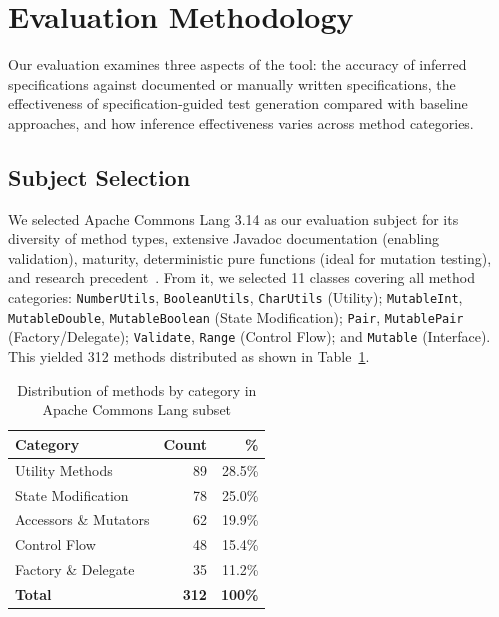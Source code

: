 \section{Evaluation Methodology}
\label{sec:methodology}

Our evaluation examines three aspects of the tool: the accuracy of inferred specifications against documented or manually written specifications, the effectiveness of specification-guided test generation compared with baseline approaches, and how inference effectiveness varies across method categories.

\subsection{Subject Selection}

We selected Apache Commons Lang 3.14 as our evaluation subject for its diversity of method types, extensive Javadoc documentation (enabling validation), maturity, deterministic pure functions (ideal for mutation testing), and research precedent~\cite{pacheco2007randoop, fraser2011evosuite}. From it, we selected 11 classes covering all method categories: \texttt{NumberUtils}, \texttt{BooleanUtils}, \texttt{CharUtils} (Utility); \texttt{MutableInt}, \texttt{MutableDouble}, \texttt{MutableBoolean} (State Modification); \texttt{Pair}, \texttt{MutablePair} (Factory/Delegate); \texttt{Validate}, \texttt{Range} (Control Flow); and \texttt{Mutable} (Interface). This yielded 312 methods distributed as shown in Table~\ref{tab:method-distribution}.

\begin{table}[ht]
\centering
\caption{Distribution of methods by category in Apache Commons Lang subset}
\label{tab:method-distribution}
\begin{tabular}{lrr}
\toprule
\textbf{Category} & \textbf{Count} & \textbf{\%} \\
\midrule
Utility Methods & 89 & 28.5\% \\
State Modification & 78 & 25.0\% \\
Accessors \& Mutators & 62 & 19.9\% \\
Control Flow & 48 & 15.4\% \\
Factory \& Delegate & 35 & 11.2\% \\
\midrule
\textbf{Total} & \textbf{312} & \textbf{100\%} \\
\bottomrule
\end{tabular}
\end{table}

